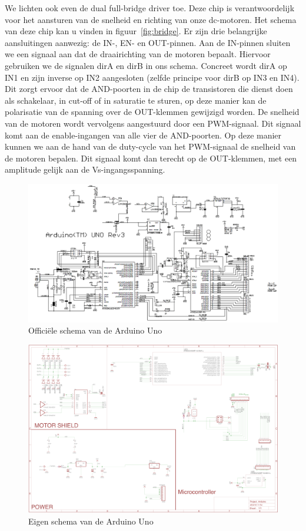 We lichten ook even de dual full-bridge driver toe. Deze chip is verantwoordelijk voor het aansturen van de snelheid en richting van onze dc-motoren. Het schema van deze chip kan u vinden in figuur~\vref{fig:bridge}. Er zijn drie belangrijke aansluitingen aanwezig: de IN-, EN- en OUT-pinnen. Aan de IN-pinnen sluiten we een signaal aan dat de draairichting van de motoren bepaalt. Hiervoor gebruiken we de signalen dirA en dirB in ons schema. Concreet wordt dirA op IN1 en zijn inverse op IN2 aangesloten (zelfde principe voor dirB op IN3 en IN4). Dit zorgt ervoor dat de AND-poorten in de chip de transistoren die dienst doen als schakelaar, in cut-off of in saturatie te sturen, op deze manier kan de polarisatie van de spanning over de OUT-klemmen gewijzigd worden. De snelheid van de motoren wordt vervolgens aangestuurd door een PWM-signaal. Dit signaal komt aan de enable-ingangen van alle vier de AND-poorten. Op deze manier kunnen we aan de hand van de duty-cycle van het PWM-signaal de snelheid van de motoren bepalen. Dit signaal komt dan terecht op de OUT-klemmen, met een amplitude gelijk aan de Vs-ingangsspanning.

\begin{figure}[H]
	\centering
	\includegraphics[width=\textheight, angle=90]{arduino-uno-r3-schematic.png}
	\caption{Offici\"{e}le schema van de Arduino Uno\label{fig:ardsch}}
\end{figure}

\begin{figure}[H]
	\centering
	\includegraphics[width=\textheight, angle=90]{eigenschematic.png}
	\caption{Eigen schema van de Arduino Uno\label{fig:eigensch}}
\end{figure}

